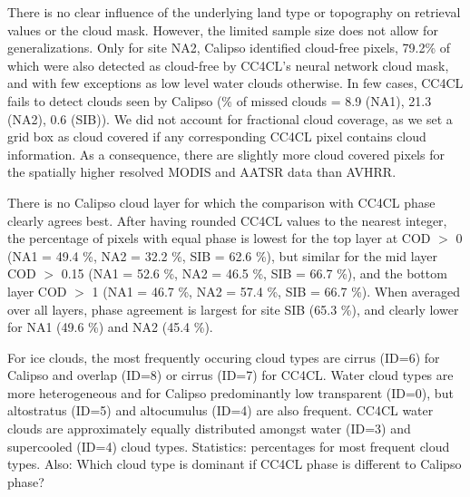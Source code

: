 There is no clear influence of the underlying land type or topography on retrieval values or the cloud mask. However, the limited sample size does not allow for generalizations. Only for site NA2, Calipso identified cloud-free pixels, 79.2\% of which were also detected as cloud-free by CC4CL's neural network cloud mask, and with few exceptions as low level water clouds otherwise. In few cases, CC4CL fails to detect clouds seen by Calipso (\% of missed clouds = 8.9 (NA1), 21.3 (NA2), 0.6 (SIB)). We did not account for fractional cloud coverage, as we set a grid box as cloud covered if any corresponding CC4CL pixel contains cloud information. As a consequence, there are slightly more cloud covered pixels for the spatially higher resolved MODIS and AATSR data than AVHRR.

There is no Calipso cloud layer for which the comparison with CC4CL phase clearly agrees best. After having rounded CC4CL values to the nearest integer, the percentage of pixels with equal phase is lowest for the top layer at COD $>$ 0 (NA1 = 49.4 \%, NA2 = 32.2 \%, SIB = 62.6 \%), but similar for the mid layer COD $>$ 0.15 (NA1 = 52.6 \%, NA2 = 46.5 \%, SIB = 66.7 \%), and the bottom layer COD $>$ 1 (NA1 = 46.7 \%, NA2 = 57.4 \%, SIB = 66.7 \%). When averaged over all layers, phase agreement is largest for site SIB (65.3 \%), and clearly lower for NA1 (49.6 \%) and NA2 (45.4 \%).

For ice clouds, the most frequently occuring cloud types are cirrus (ID=6) for Calipso and overlap (ID=8) or cirrus (ID=7) for CC4CL. Water cloud types are more heterogeneous and for Calipso predominantly low transparent (ID=0), but altostratus (ID=5) and altocumulus (ID=4) are also frequent. CC4CL water clouds are approximately equally distributed amongst water (ID=3) and supercooled (ID=4) cloud types. Statistics: percentages for most frequent cloud types. Also: Which cloud type is dominant if CC4CL phase is different to Calipso phase?

